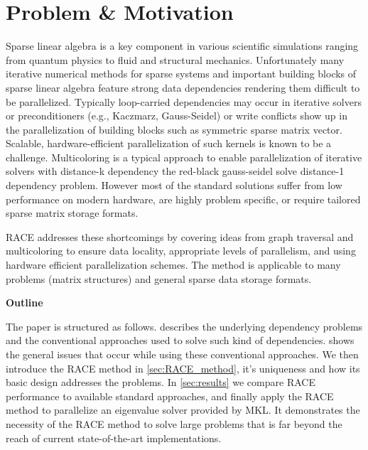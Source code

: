 	
\section{Problem \& Motivation}
	Sparse linear algebra is a key component in various scientific simulations
	ranging from quantum physics to fluid and structural mechanics.
	Unfortunately many iterative numerical methods for sparse systems 
	and important building 	blocks of sparse linear algebra feature strong 
	data dependencies rendering them difficult to be parallelized.
	Typically	loop-carried dependencies may occur in
	iterative solvers  or preconditioners (e.g., Kaczmarz, Gauss-Seidel) 
	or write conflicts show up in the parallelization of building blocks such 
	as symmetric sparse matrix vector.
	Scalable, hardware-efficient parallelization of such kernels is known to be a 
	challenge. Multicoloring is a typical approach to enable parallelization
	of iterative solvers with distance-k dependency \eg the 
	red-black gauss-seidel solve distance-1 dependency problem.
	However most of the standard solutions suffer from low performance
	on modern hardware, are highly problem specific, or require tailored
    sparse matrix storage formats.

	\Acrshort{RACE} addresses these shortcomings by covering ideas from graph traversal
	and multicoloring to ensure data locality, appropriate levels of parallelism,
	and using hardware efficient parallelization schemes. The method is applicable
	to many problems (\ie matrix structures) and general sparse data storage formats.
	

\noindent\textbf{Outline}


\noindent	The paper is structured as follows.  describes
	the underlying dependency problems and the conventional
	approaches used to solve such kind of dependencies.  
	shows the general issues that occur while using these conventional
	approaches. We then introduce the \acrshort{RACE} method in \cref{sec:RACE_method},
	it's uniqueness	and how its	basic design addresses the problems. 
	In \cref{sec:results} we compare \acrshort{RACE} performance to
	available standard approaches, and finally apply the \acrshort{RACE}
	method to parallelize an eigenvalue solver provided by \acrshort{MKL}.
	It demonstrates the necessity of the \acrshort{RACE} method to solve 
	large problems that is far beyond the reach of current state-of-the-art
	implementations.
	
